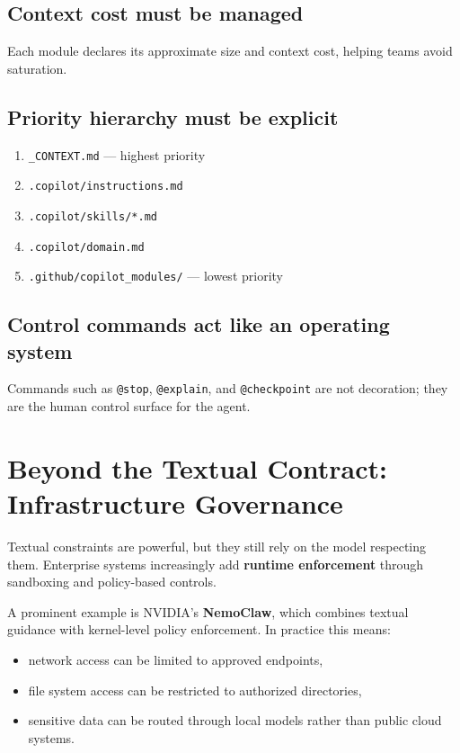 \subsection{Context cost must be managed}
Each module declares its approximate size and context cost, helping teams avoid saturation.

\subsection{Priority hierarchy must be explicit}
\begin{enumerate}
  \item \texttt{\_CONTEXT.md} --- highest priority
  \item \texttt{.copilot/instructions.md}
  \item \texttt{.copilot/skills/*.md}
  \item \texttt{.copilot/domain.md}
  \item \texttt{.github/copilot\_modules/} --- lowest priority
\end{enumerate}

\subsection{Control commands act like an operating system}
Commands such as \texttt{@stop}, \texttt{@explain}, and \texttt{@checkpoint} are not decoration; they are the human control surface for the agent.

\section{Beyond the Textual Contract: Infrastructure Governance}

Textual constraints are powerful, but they still rely on the model respecting them. Enterprise systems increasingly add \textbf{runtime enforcement} through sandboxing and policy-based controls.

A prominent example is NVIDIA's \textbf{NemoClaw}, which combines textual guidance with kernel-level policy enforcement. In practice this means:
\begin{itemize}
  \item network access can be limited to approved endpoints,
  \item file system access can be restricted to authorized directories,
  \item sensitive data can be routed through local models rather than public cloud systems.
\end{itemize}


